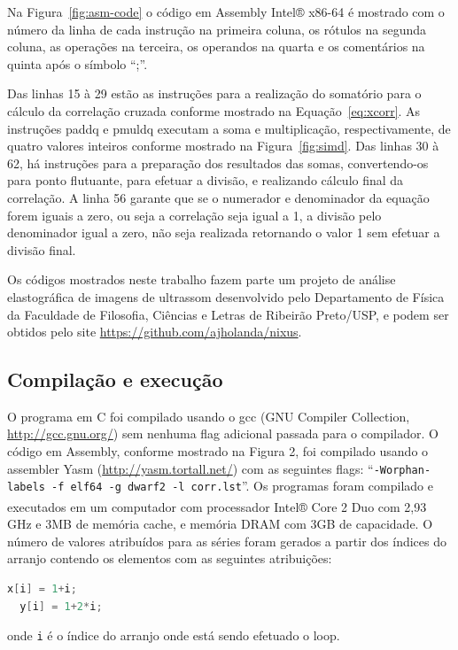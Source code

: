 \documentclass[a4paper]{article}
\def\TM{\textsuperscript{\texttrademark}}
\begin{document}
Na Figura~\ref{fig:asm-code} o código em Assembly Intel® x86-64 é
mostrado com o número da linha de cada instrução na primeira coluna,
os rótulos na segunda coluna, as operações na terceira, os operandos
na quarta e os comentários na quinta após o símbolo “;”.

Das linhas 15 à 29 estão as instruções para a realização do somatório
para o cálculo da correlação cruzada conforme mostrado na
Equação~\ref{eq:xcorr}. As instruções paddq e pmuldq executam a soma e
multiplicação, respectivamente, de quatro valores inteiros conforme
mostrado na Figura~\ref{fig:simd}. Das linhas 30 à 62, há instruções para a
preparação dos resultados das somas, convertendo-os para ponto
flutuante, para efetuar a divisão, e realizando cálculo final da
correlação. A linha 56 garante que se o numerador e denominador da
equação forem iguais a zero, ou seja a correlação seja igual a 1, a
divisão pelo denominador igual a zero, não seja realizada retornando o
valor 1 sem efetuar a divisão final.

Os códigos mostrados neste trabalho fazem parte um projeto de análise
elastográfica de imagens de ultrassom desenvolvido pelo Departamento
de Física da Faculdade de Filosofia, Ciências e Letras de Ribeirão
Preto/USP, e podem ser obtidos pelo site
\url{https://github.com/ajholanda/nixus}.  

\subsection*{Compilação e execução}

O programa em C foi compilado usando o gcc (GNU Compiler Collection,
\url{http://gcc.gnu.org/}) sem nenhuma flag adicional passada para o
compilador. O código em Assembly, conforme mostrado na Figura 2, foi
compilado usando o assembler Yasm (\url{http://yasm.tortall.net/}) com as
seguintes flags: ``{\tt -Worphan-labels -f elf64 -g dwarf2 -l corr.lst}''. Os
programas foram compilado e executados em um computador com
processador Intel® Core\TM{} 2 Duo com 2,93 GHz e 3MB de memória cache, e
memória DRAM com 3GB de capacidade.  O número de valores atribuídos
para as séries foram gerados a partir dos índices do arranjo contendo
os elementos com as seguintes atribuições:

\begin{lstlisting}[language=C,frame=noframe,numbers=right]
  x[i] = 1+i;
  y[i] = 1+2*i;
\end{lstlisting}

\noindent onde {\tt i} é o índice do arranjo onde está sendo efetuado
o loop.
\end{document}
